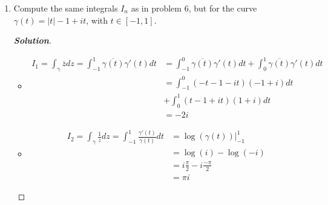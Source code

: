 \documentclass[12pt,leqno]{article}
\theoremstyle{definition}
\newenvironment{Solution}{\begin{proof}[\textnormal{\textbf{Solution}}]}{\end{proof}}
\begin{document}
\begin{enumerate}
\begin{Solution}
\begin{itemize}
      \item \begin{align*}I_1=\int_{\gamma}\overline{z}dz=\int_{-1}^1\overline{\gamma(t)}\gamma'(t)dt&=\int_{-1}^1(1-t^2-it)(-2t+i)dt\\&=\int_{-1}^12t^3-t+i\left(t^2+1\right)dt\\&=\frac{t^4}{2}-\frac{t^2}{2}+i\left(\frac{t^3}{3}+t\right)\Big |_{-1}^1\\&=\frac{8}{3}i\end{align*}
      \item \begin{align*}I_2=\int_{\gamma}\frac{1}{z}dz=\int_{-1}^1\frac{\gamma'(t)}{\gamma(t)}dt&=\log(\gamma(t))\Big|_{-1}^1\\&=\log(i)-\log(-i)\\&=i\frac{\pi}{2}-i\frac{-\pi}{2}\\&=\pi i\end{align*}
      \item Let $u=\gamma(t)$. Then $du=\gamma'(t)dt$, hence \begin{align*}I_3=\int_{\gamma}\frac{dz}{z^3}=\int_{-1}^1\frac{\gamma'(t)}{\gamma(t)^3}dt&=\int_{-i}^i\frac{1}{u^3}du\\&=-\frac{1}{2}\frac{1}{u^2}\Big|_{-i}^i\\&=0\end{align*}\qedhere
     \end{itemize}
    \end{Solution}
   \item Compute the same integrals $I_n$ as in problem 6, but for the curve $\gamma(t)=|t|-1+it$, with $t\in[-1,1]$.
    \begin{Solution}\indent
     \begin{itemize}
      \item \begin{align*}I_1=\int_{\gamma}\overline{z}dz=\int_{-1}^1\overline{\gamma(t)}\gamma'(t)dt&=\int_{-1}^0\overline{\gamma(t)}\gamma'(t)dt+\int_0^1\overline{\gamma(t)}\gamma'(t)dt\\&=\int_{-1}^0(-t-1-it)(-1+i)dt\\&+\int_0^1(t-1+it)(1+i)dt\\&=-2i\end{align*}
      \item \begin{align*}I_2=\int_{\gamma}\frac{1}{z}dz=\int_{-1}^1\frac{\gamma'(t)}{\gamma(t)}dt&=\log(\gamma(t))\Big|_{-1}^1\\&=\log(i)-\log(-i)\\&=i\frac{\pi}{2}-i\frac{-\pi}{2}\\&=\pi i\end{align*}

\end{itemize}
\end{Solution}
\end{enumerate}
\end{document}
